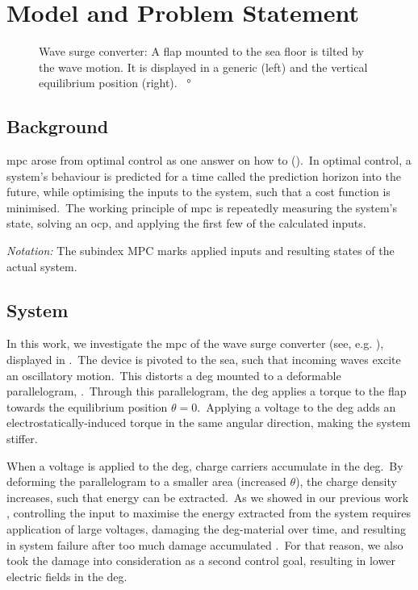 \section{Model and Problem Statement}

\begin{figure}[htb]
	\centering
	\fontsize{9}{0}\selectfont
	\def\svgwidth{0.5\textwidth}
	
	\caption{Wave surge converter: A flap mounted to the sea floor is tilted by the wave motion. It is displayed in a generic (left) and the vertical equilibrium position (right). \SI{}{\degree}}%
\label{fig:flap}
\end{figure}

\subsection{Background}
\ac{mpc} arose from optimal control as one answer on how to  (\cite{rawlings2017mpc}).\ 
In optimal control, a system's behaviour is predicted for a time called the prediction horizon \tf into the future, while optimising the inputs to the system, such that a cost function is minimised.\
The working principle of \ac{mpc} is repeatedly measuring the system's state, solving an \ac{ocp}, and applying the first few of the calculated inputs.\

\textit{Notation:} The subindex $\mathrm{MPC}$ marks applied inputs and resulting states of the actual system.

\subsection{System}
In this work, we investigate the \ac{mpc} of the wave surge converter (see, e.g. \cite{Whittaker2012}), displayed in .\
The device is pivoted to the sea, such that incoming waves excite an oscillatory motion.\ 
This distorts a \ac{deg} mounted to a deformable parallelogram, \cite{Moretti2014}.\ 
Through this parallelogram, the \ac{deg} applies a torque to the flap towards the equilibrium position $\theta=0$.\ 
Applying a voltage to the \ac{deg} adds an electrostatically-induced torque in the same angular direction, making the system stiffer.\ 

When a voltage is applied to the \ac{deg}, charge carriers accumulate in the \ac{deg}.\ 
By deforming the parallelogram to a smaller area (increased $\theta$), the charge density increases, such that energy can be extracted.\  
As we showed in our previous work \cite{Hoffmann2022moocp_wcdeg}, controlling the input to maximise the energy extracted from the system requires application of large voltages, damaging the \ac{deg}-material over time, and resulting in system failure after too much damage accumulated \cite{Chen2019}.\
For that reason, we also took the damage into consideration as a second control goal, resulting in lower electric fields in the \ac{deg}.

